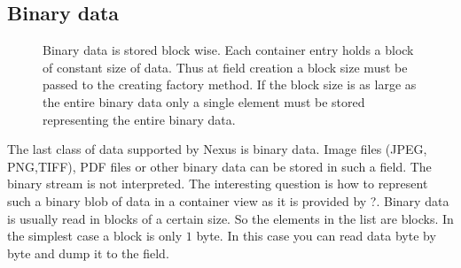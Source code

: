 \subsection{Binary data}
\begin{figure}[tb]
\centering
\begin{minipage}[c]{0.4\linewidth}
\centering
{}
\end{minipage}
\hfill
\begin{minipage}[c]{0.58\linewidth}
\caption{{\small\label{fig:container_binary} Binary data is stored block wise.
Each container entry holds a block of constant size of data. Thus at 
field creation a block size must be passed to the creating factory method. 
If the block size is as large as the entire binary data only a single element 
must be stored representing the entire binary data.}}
\end{minipage}
\end{figure}
The last class of data supported by Nexus is binary data. 
Image files (JPEG, PNG,TIFF), PDF files or other binary data can be stored in
such a field. The binary stream is not interpreted. 
The interesting question is how to represent such a binary blob of data in 
a container view as it is provided by \nxfield?. 
Binary data is usually read in blocks of a certain size. So the elements
in the list are blocks. In the simplest case a block is only $1$ byte. 
In this case you can read data byte by byte and dump it to the field. 




 

